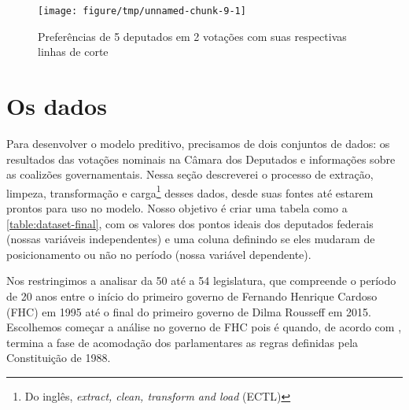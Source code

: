 \documentclass[a4paper,titlepage]{ppgi}\usepackage[]{graphicx}\usepackage[]{color}
\newenvironment{knitrout}{}{} %
\begin{document}
\begin{knitrout}
\color{fgcolor}\begin{figure}
\texttt{[image: figure/tmp/unnamed-chunk-9-1]} \caption[Preferências de 5 deputados em 2 votações com suas respectivas linhas de corte]{Preferências de 5 deputados em 2 votações com suas respectivas linhas de corte}\label{fig:unnamed-chunk-9}
\end{figure}


\end{knitrout}










\section{Os dados}

Para desenvolver o modelo preditivo, precisamos de dois conjuntos de dados: os
resultados das votações nominais na Câmara dos Deputados e informações sobre as
coalizões governamentais. Nessa seção descreverei o processo de extração,
limpeza, transformação e carga\footnote{Do inglês, \emph{extract, clean,
transform and load} (ECTL)} desses dados, desde suas fontes até estarem prontos
para uso no modelo. Nosso objetivo é criar uma tabela como a
\ref{table:dataset-final}, com os valores dos pontos ideais dos deputados
federais (nossas variáveis independentes) e uma coluna definindo se eles
mudaram de posicionamento ou não no período (nossa variável dependente).

Nos restringimos a analisar da 50\textordfeminine{} até a 54\textordfeminine{}
legislatura, que compreende o período de 20 anos entre o início do primeiro
governo de Fernando Henrique Cardoso (FHC) em 1995 até o final do primeiro
governo de Dilma Rousseff em 2015. Escolhemos começar a análise no governo de
FHC pois é quando, de acordo com , termina a fase de
acomodação dos parlamentares as regras definidas pela Constituição de 1988.
\end{document}
